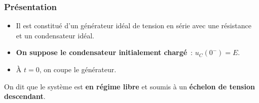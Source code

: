 \documentclass[../../main/main.tex]{subfiles}
\begin{document}
\subsubsection{Présentation}
\noindent
\begin{minipage}[c]{.6\linewidth}
	\begin{itemize}
		\item Il est constitué d'un générateur idéal de tension en série avec une
		      résistance et un condensateur idéal.
		\item \textbf{On suppose le condensateur initialement chargé}~: $u_C(0^-) =
			      E$.
		\item À $t=0$, on coupe le générateur.
	\end{itemize}
	On dit que le système est \textbf{en régime libre} et soumis à un
	\textbf{échelon de tension descendant}.
\end{minipage}
\hfill
\end{document}

